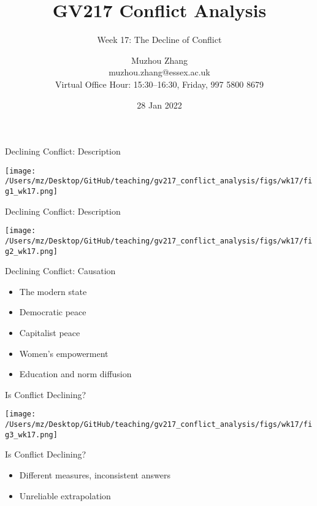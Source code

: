 \documentclass[handout]{beamer}
\title{GV217 Conflict Analysis}
\subtitle{Week 17: The Decline of Conflict}
\author{Muzhou Zhang\\ muzhou.zhang@essex.ac.uk\\ Virtual Office Hour: 15:30--16:30, Friday, 997 5800 8679}
\date{28 Jan 2022}
\begin{document}
\maketitle
{}

\begin{frame}{Declining Conflict: Description}
    \pause
    \begin{center}
        \texttt{[image: /Users/mz/Desktop/GitHub/teaching/gv217\_conflict\_analysis/figs/wk17/fig1\_wk17.png]}
    \end{center}
\end{frame}

\begin{frame}{Declining Conflict: Description}
    \pause
    \begin{center}
        \texttt{[image: /Users/mz/Desktop/GitHub/teaching/gv217\_conflict\_analysis/figs/wk17/fig2\_wk17.png]}
    \end{center}
\end{frame}

\begin{frame}{Declining Conflict: Causation}
    \begin{itemize}
        \pause\item The modern state
        \pause\item Democratic peace
        \pause\item Capitalist peace
        \pause\item Women's empowerment
        \pause\item Education and norm diffusion
    \end{itemize}
\end{frame}

\begin{frame}{Is Conflict Declining?}
    \pause
    \begin{center}
        \texttt{[image: /Users/mz/Desktop/GitHub/teaching/gv217\_conflict\_analysis/figs/wk17/fig3\_wk17.png]}
    \end{center}
\end{frame}

\begin{frame}{Is Conflict Declining?}
    \begin{itemize}
        \pause\item Different measures, inconsistent answers
        \pause\item Unreliable extrapolation
    \end{itemize}
\end{frame}
\end{document}

